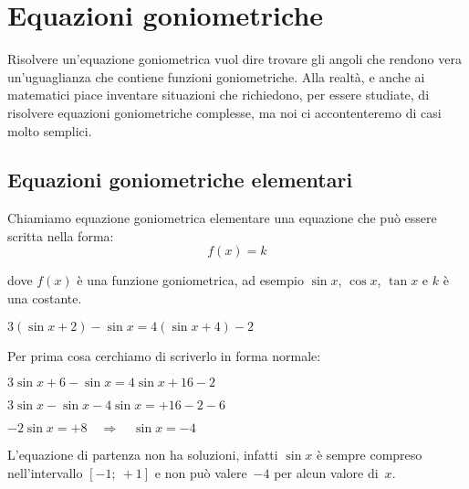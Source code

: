 \section{Equazioni goniometriche}
\label{sec:gonio_equazionigonio}

Risolvere un'equazione goniometrica vuol dire trovare gli angoli che rendono 
vera un'uguaglianza che contiene funzioni goniometriche. 
Alla realtà, e anche ai matematici piace inventare situazioni che richiedono, 
per essere studiate, di risolvere equazioni goniometriche complesse, ma noi ci 
accontenteremo di casi molto semplici.

\subsection{Equazioni goniometriche elementari}

Chiamiamo equazione goniometrica elementare una equazione che può essere 
scritta nella forma:
\[f(x)=k\]

dove $f(x)$ è una funzione goniometrica, ad esempio $\sin x$, $\cos x$, 
$\tan x$ e $k$ è una costante.

 \begin{esempio}
  $3(\sin x +2) - \sin x = 4 (\sin x +4)-2$
  
  Per prima cosa cerchiamo di scriverlo in forma normale:
  
  $3 \sin x +6 - \sin x = 4 \sin x +16-2$
  
  $3 \sin x - \sin x - 4 \sin x = +16-2-6 $
  
  $- 2 \sin x = +8 \quad \Rightarrow \quad \sin x = -4 $
  
  L'equazione di partenza non ha soluzioni, infatti $\sin x$ è sempre compreso 
  nell'intervallo $\left [-1;~+1 \right]$ e non può valere~$-4$ per alcun 
  valore di~$x$.
 \end{esempio}

